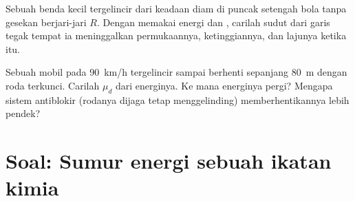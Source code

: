 \begin{exercise}[$\star\star\star$]\label{exo:b1:work-and-energy:11}
Sebuah benda kecil tergelincir dari keadaan diam di puncak setengah bola
tanpa gesekan berjari-jari $R$. Dengan memakai energi dan ,
carilah sudut dari garis tegak tempat ia meninggalkan permukaannya,
ketinggiannya, dan lajunya ketika itu.
\end{exercise}

\begin{exercise}[$\star\star\star$]\label{exo:b1:work-and-energy:12}
Sebuah mobil pada \qty{90}{km/h} tergelincir sampai berhenti sepanjang
\qty{80}{m} dengan roda terkunci. Carilah $\mu_d$ dari energinya. Ke
mana energinya pergi? Mengapa sistem antiblokir (rodanya dijaga tetap
menggelinding) memberhentikannya lebih pendek?
\end{exercise}

\section{Soal: Sumur energi sebuah ikatan kimia}

